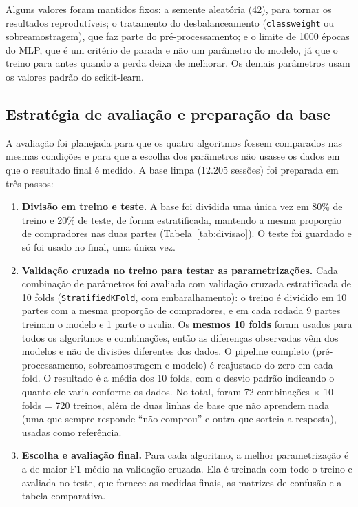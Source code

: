 \documentclass[11pt,a4paper]{article}
\DeclareRobustCommand{\atr}[1]{{\renewcommand{\_}{\textunderscore\allowbreak}\texttt{#1}}}
\begin{document}
Alguns valores foram mantidos fixos: a semente aleatória (42), para tornar os resultados reprodutíveis; o tratamento
do desbalanceamento (\atr{class\_weight} ou sobreamostragem), que faz parte do pré-processamento; e o limite de 1000
épocas do MLP, que é um critério de parada e não um parâmetro do modelo, já que o treino para antes quando a perda
deixa de melhorar. Os demais parâmetros usam os valores padrão do scikit-learn.

\subsection{Estratégia de avaliação e preparação da base}

A avaliação foi planejada para que os quatro algoritmos fossem comparados nas mesmas condições e para que a escolha dos
parâmetros não usasse os dados em que o resultado final é medido. A base limpa (12.205 sessões) foi preparada em três
passos:
\begin{enumerate}
  \item \textbf{Divisão em treino e teste.} A base foi dividida uma única vez em 80\% de treino e 20\% de teste, de
        forma estratificada, mantendo a mesma proporção de compradores nas duas partes (Tabela~\ref{tab:divisao}). O
        teste foi guardado e só foi usado no final, uma única vez.
  \item \textbf{Validação cruzada no treino para testar as parametrizações.} Cada combinação de parâmetros foi
        avaliada com validação cruzada estratificada de 10 folds (\atr{StratifiedKFold}, com embaralhamento): o
        treino é dividido em 10 partes com a mesma proporção de compradores, e em cada rodada 9 partes treinam o
        modelo e 1 parte o avalia. Os \textbf{mesmos 10 folds} foram usados para todos os algoritmos e combinações,
        então as diferenças observadas vêm dos modelos e não de divisões diferentes dos dados. O pipeline completo
        (pré-processamento, sobreamostragem e modelo) é reajustado do zero em cada fold. O resultado é a média dos 10
        folds, com o desvio padrão indicando o quanto ele varia conforme os dados. No total, foram 72 combinações
        $\times$ 10 folds = 720 treinos, além de duas linhas de base que não aprendem nada (uma que sempre responde
        ``não comprou'' e outra que sorteia a resposta), usadas como referência.
  \item \textbf{Escolha e avaliação final.} Para cada algoritmo, a melhor parametrização é a de maior F1 médio na
        validação cruzada. Ela é treinada com todo o treino e avaliada no teste, que fornece as medidas finais, as
        matrizes de confusão e a tabela comparativa.
\end{enumerate}
\end{document}
